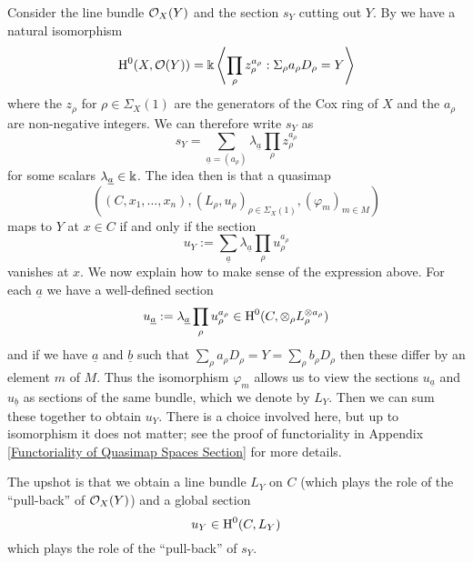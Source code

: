Consider the line bundle $\mathcal{O}_X(Y)$ and the section $s_Y$ cutting out $Y$. By \cite{CoxRing} we have a natural isomorphism
\begin{equation*} \operatorname{H}^0(X,\mathcal{O}(Y)) = \Bbbk \left\langle \prod_{\rho} z_\rho^{a_\rho} : \Sigma_\rho a_\rho D_\rho = Y \right\rangle \end{equation*}
where the $z_\rho$ for $\rho \in \Sigma_X(1)$ are the generators of the Cox ring of $X$ and the $a_\rho$ are non-negative integers. We can therefore write $s_Y$ as
\begin{equation*} s_Y = \sum_{\underline{a}=(a_\rho)} \lambda_{\underline{a}} \prod_\rho z_\rho^{a_\rho} \end{equation*}
for some scalars $\lambda_{\underline{a}} \in \Bbbk$. The idea then is that a quasimap
\begin{equation*} ((C,x_1,\ldots,x_n), (L_\rho,u_\rho)_{\rho \in \Sigma_X(1)}, (\varphi_m)_{m \in M}) \end{equation*}
maps to $Y$ at $x \in C$ if and only if the section
\begin{equation*} u_Y := \sum_{\underline{a}} \lambda_{\underline{a}} \prod_\rho u_\rho^{a_\rho} \end{equation*}
vanishes at $x$. We now explain how to make sense of the expression above. For each $\underline{a}$ we have a well-defined section
\begin{equation*} u_{\underline{a}} := \lambda_{\underline{a}} \prod_\rho u_\rho^{a_\rho} \in \operatorname{H}^0(C,\otimes_\rho L_\rho^{\otimes a_\rho}) \end{equation*}
and if we have $\underline{a}$ and $\underline{b}$ such that $\sum_\rho a_\rho D_\rho = Y = \sum_\rho b_\rho D_\rho$ then these differ by an element $m$ of $M$. Thus the isomorphism $\varphi_m$ allows us to view the sections $u_{\underline{a}}$ and $u_{\underline{b}}$ as sections of the same bundle, which we denote by $L_Y$. Then we can sum these together to obtain $u_Y$. There is a choice involved here, but up to isomorphism it does not matter; see the proof of functoriality in Appendix \ref{Functoriality of Quasimap Spaces Section} for more details.

The upshot is that we obtain a line bundle $L_Y$ on $C$ (which plays the role of the ``pull-back'' of $\mathcal{O}_X(Y)$) and a global section
\begin{equation*} u_Y \in \operatorname{H}^0(C,L_Y) \end{equation*}
which plays the role of the ``pull-back'' of $s_Y$.

